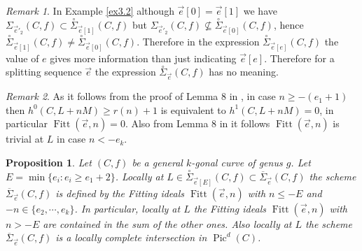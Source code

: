 \documentclass{article}
\DeclareMathOperator{\Pic}{Pic}
\DeclareMathOperator{\Fitt}{Fitt}
\newtheorem{proposition}{Proposition}
\theoremstyle{definition}
\theoremstyle{remark}
\newtheorem{remark}{Remark}
\begin{document}
\begin{remark}\label{warning}
In Example \ref{ex3.2} although $\overrightarrow {e}[0]=\overrightarrow {e}[1]$ we have $\Sigma _{\overrightarrow {e}'_2}(C,f) \subset \overset {\circ}{\Sigma}_{\overrightarrow {e}[1]}(C,f)$ but $\Sigma_{\overrightarrow{e}'_2}(C,f) \nsubseteq \overset {\circ}{\Sigma}_{\overrightarrow {e}[0]}(C,f)$, hence $\overset {\circ}{\Sigma}_{\overrightarrow {e}[1]}(C,f) \neq \overset {\circ}{\Sigma}_{\overrightarrow {e}[0]}(C,f)$.
Therefore in the expression $\overset {\circ}{\Sigma}_{\overrightarrow {e}[e]}(C,f)$ the value of $e$ gives more information than just indicating $\overrightarrow {e}[e]$.
Therefore for a splitting sequence $\overrightarrow {e}$ the expression $\overset {\circ}{\Sigma}_{\overrightarrow {e}}(C,f)$ has no meaning.
\end{remark}

\begin{remark}\label{rem2.1}
As it follows from the proof of Lemma 8 in \cite{ref2}, in case $n \geq -(e_1+1)$ then $h^0(C,L+nM) \geq r(n)+1$ is equivalent to $h^1(C,L+nM)=0$, in particular $\Fitt(\overrightarrow {e},n)=0$.
Also from Lemma 8 in \cite{ref2} it follows $\Fitt (\overrightarrow {e},n)$ is trivial at $L$ in case $n<-e_k$.
\end{remark}

\begin{proposition}\label{prop1}
Let $(C,f)$ be a general $k$-gonal curve of genus $g$.
Let $E = \min \{e_i : e_i \geq e_1+2 \}$.
Locally at $L \in \overset{\circ}{ \Sigma}_{\overrightarrow{e}[E]}(C,f) \subset \overline {\Sigma}_{\overrightarrow {e}}(C,f)$ the scheme $\overline {\Sigma}_{\overrightarrow {e}}(C,f)$ is defined by the Fitting ideals $\Fitt (\overrightarrow {e},n)$ with $n \leq -E$ and $-n \in  \{ e_2, \cdots , e_k \}$.
In particular, locally at $L$ the Fitting ideals $\Fitt (\overrightarrow {e},n)$ with $n>-E$ are contained in the sum of the other ones.
Also locally at $L$ the scheme $\overline {\Sigma}_{\overrightarrow {e}}(C,f)$ is a locally complete intersection in $\Pic^d(C)$.
\end{proposition}
\end{document}
